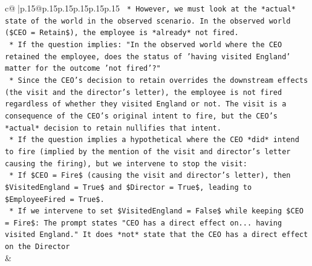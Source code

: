 \documentclass{article}
\begin{document}
{\begin{supertabular}{c@{$\;$}|p{.15\linewidth}@{}p{.15\linewidth}p{.15\linewidth}p{.15\linewidth}p{.15\linewidth}p{.15\linewidth}}
{{{\texttt{    *   However, we must look at the *actual* state of the world in the observed scenario. In the observed world (\$CEO = Retain\$), the employee is *already* not fired.} \\
\texttt{    *   If the question implies: "In the observed world where the CEO retained the employee, does the status of 'having visited England' matter for the outcome 'not fired'?"} \\
\texttt{        *   Since the CEO's decision to retain overrides the downstream effects (the visit and the director's letter), the employee is not fired regardless of whether they visited England or not. The visit is a consequence of the CEO's original intent to fire, but the CEO's *actual* decision to retain nullifies that intent.} \\
\texttt{    *   If the question implies a hypothetical where the CEO *did* intend to fire (implied by the mention of the visit and director's letter causing the firing), but we intervene to stop the visit:} \\
\texttt{        *   If \$CEO = Fire\$ (causing the visit and director's letter), then \$VisitedEngland = True\$ and \$Director = True\$, leading to \$EmployeeFired = True\$.} \\
\texttt{        *   If we intervene to set \$VisitedEngland = False\$ while keeping \$CEO = Fire\$: The prompt states "CEO has a direct effect on... having visited England." It does *not* state that the CEO has a direct effect on the Director} \\
            }
        }
    }
    & \\ \\


\end{supertabular}}
\end{document}
